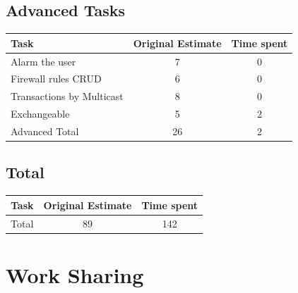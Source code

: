 \documentclass[11pt, a4paper]{article}
\begin{document}
\subsection{Advanced Tasks}
\begin{tabular} {| l | c | c |}\hline
Task &	Original Estimate & Time spent \\ \hline
Alarm the user &	7	& 0 \\ \hline
Firewall rules CRUD &	6 & 	0 \\ \hline
Transactions by Multicast &	8  &	0 \\ \hline
Exchangeable & 5 & 2 \\ \hline
Advanced Total & 26 &	2 \\ \hline
\end{tabular}

\subsection{Total}
\begin{tabular} {| l | c | c |}\hline
	Task &	Original Estimate & Time spent \\ \hline
	Total & 89 & 142 \\ \hline
\end{tabular}

\section{Work Sharing}
\end{document}
